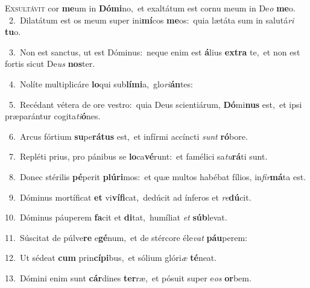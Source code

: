 \lettrine{\initial\textcolor{\initialcolor}{E}}{xsultávit} cor \textbf{me}\-um in \textbf{Dó}\-\textbf{mi}no,~\star et exaltátum est cornu meum in De\textit{o} \textbf{me}\-o.\\
{\numbfont\textcolor{\numbcolor}{~2.}}~Dilatátum est os meum super ini\-\textbf{mí}\-cos \textbf{me}\-os:~\star quia lætáta sum in salutá\textit{ri} \textbf{tu}\-o.\par
{\numbfont\textcolor{\numbcolor}{~3.}}~Non est sanctus, ut est Dóminus:~\dagger neque enim est \textbf{á}\-lius \textbf{ex}\-\textbf{tra} te,~\star et non est fortis sicut De\textit{us} \textbf{nos}\-ter.\par
{\numbfont\textcolor{\numbcolor}{~4.}}~Nolíte multiplicáre \textbf{lo}\-qui sub\-\textbf{lí}\-\textbf{mi}a,~\star glo\-\textit{ri}\-\textbf{án}tes:\par
{\numbfont\textcolor{\numbcolor}{~5.}}~Recédant vétera de ore vestro:~\dagger quia Deus scientiárum, \textbf{Dó}\-mi\textbf{nus} est,~\star et ipsi præparántur cogita\-\textit{ti}\-\textbf{ó}nes.\par
{\numbfont\textcolor{\numbcolor}{~6.}}~Arcus fórtium \textbf{su}\-pe\-\textbf{rá}\-\textbf{tus} est,~\star et infírmi accíncti \textit{sunt} \textbf{ró}\-bore.\par
{\numbfont\textcolor{\numbcolor}{~7.}}~Repléti prius, pro pánibus se \textbf{lo}\-ca\-\textbf{vé}\-runt:~\star et famélici sa\-\textit{tu}\-\textbf{rá}ti sunt.\par
{\numbfont\textcolor{\numbcolor}{~8.}}~Donec stérilis \textbf{pé}\-perit \textbf{plú}\-\textbf{ri}mos:~\star et quæ multos habébat fílios, in\-\textit{fir}\-\textbf{má}ta est.\par
{\numbfont\textcolor{\numbcolor}{~9.}}~Dóminus mortíficat \textbf{et} vi\-\textbf{ví}\-\textbf{fi}cat,~\star dedúcit ad ínferos et \textit{re}\-\textbf{dú}cit.\par
{\numbfont\textcolor{\numbcolor}{10.}}~Dóminus páuperem \textbf{fa}\-cit et \textbf{di}\-tat,~\star humíliat \textit{et} \textbf{súb}\-levat.\par
{\numbfont\textcolor{\numbcolor}{11.}}~Súscitat de púlve\textbf{re} e\-\textbf{gé}\-num,~\star et de stércore éle\textit{vat} \textbf{páu}\-perem:\par
{\numbfont\textcolor{\numbcolor}{12.}}~Ut sédeat \textbf{cum} prin\-\textbf{cí}\-\textbf{pi}bus,~\star et sólium glóri\textit{æ} \textbf{té}\-neat.\par
{\numbfont\textcolor{\numbcolor}{13.}}~Dómini enim sunt \textbf{cár}\-dines \textbf{ter}\-ræ,~\star et pósuit super e\textit{os} \textbf{or}\-bem.\par
